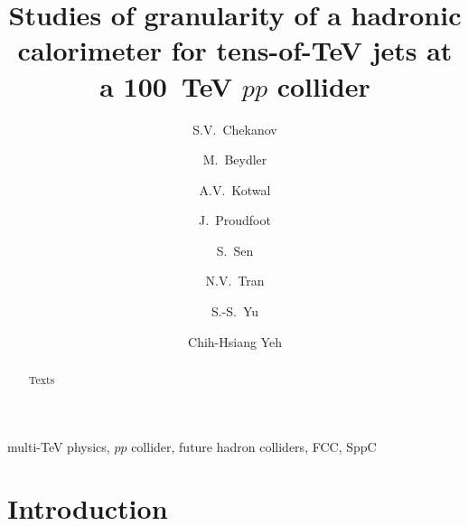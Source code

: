 \documentclass[final,1p,11pt]{elsarticle}
\begin{document}
\begin{frontmatter}

\title{
Studies of granularity of a hadronic calorimeter for tens-of-TeV jets  at a 100~TeV $pp$ collider 
}

\author[add1]{S.V.~Chekanov}

\author[add1]{M.~Beydler}

\author[addDuke,add2]{A.V.~Kotwal}

\author[add1]{J.~Proudfoot}

\author[addDuke]{S.~Sen}

\author[add2]{N.V.~Tran}

\author[add3]{S.-S.~Yu}

\author[add3]{Chih-Hsiang Yeh}

\address[add1]{
HEP Division, Argonne National Laboratory,
9700 S.~Cass Avenue,
Argonne, IL 60439, USA. 
}

\address[addDuke]{
Department of Physics, Duke University, USA
}

\address[add2]{
Fermi National Accelerator Laboratory
}

\address[addMSU]{
Department of Physics, Michigan State University, 220
Trowbridge Road, East Lansing, MI 48824 
}


\address[add3]{
Department of Physics, National Central University, Chung-Li, Taoyuan City 32001, Taiwan
}


\begin{abstract}
Texts

\end{abstract}

\begin{keyword}
multi-TeV physics, $pp$ collider, future hadron colliders, FCC, SppC
\end{keyword}



\end{frontmatter}



\section{Introduction}
\end{document}
